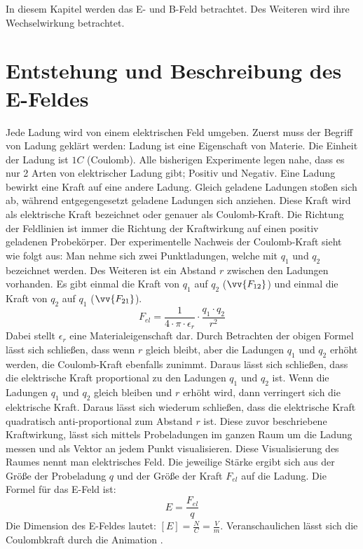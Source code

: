 In diesem Kapitel werden das E- und B-Feld betrachtet.
Des Weiteren wird ihre Wechselwirkung betrachtet.
\section{Entstehung und Beschreibung des E-Feldes}
Jede Ladung wird von einem elektrischen Feld umgeben.
Zuerst muss der Begriff von Ladung geklärt werden:
Ladung ist eine Eigenschaft von Materie.
Die Einheit der Ladung ist $1C$ (Coulomb).
Alle bisherigen Experimente legen nahe, dass es nur 2 Arten von elektrischer Ladung gibt; Positiv und Negativ.
Eine Ladung bewirkt eine Kraft auf eine andere Ladung.
Gleich geladene Ladungen stoßen sich ab, während entgegengesetzt geladene Ladungen sich anziehen.
Diese Kraft wird als elektrische Kraft bezeichnet oder genauer als Coulomb-Kraft.
Die Richtung der Feldlinien ist immer die Richtung der Kraftwirkung auf einen positiv geladenen Probekörper.
Der experimentelle Nachweis der Coulomb-Kraft sieht wie folgt aus:
Man nehme sich zwei Punktladungen, welche mit $q_1$ und $q_2$ bezeichnet werden. 
Des Weiteren ist ein Abstand $r$ zwischen den Ladungen vorhanden.
Es gibt einmal die Kraft von $q_1$ auf $q_2$ ($\vv{F_{12}}$) und einmal die Kraft von $q_2$ auf $q_1$ ($\vv{F_{21}}$).
\begin{equation*}
   F_{el} = \frac{1}{4 \cdot \pi \cdot \epsilon_r} \cdot \frac{q_1 \cdot q_2}{r^2}    
\end{equation*}
Dabei stellt $\epsilon_r$ eine Materialeigenschaft dar.
Durch Betrachten der obigen Formel lässt sich schließen, dass wenn $r$ gleich bleibt, aber die Ladungen $q_1$ und $q_2$ erhöht werden, die Coulomb-Kraft ebenfalls zunimmt.
Daraus lässt sich schließen, dass die elektrische Kraft proportional zu den Ladungen $q_1$ und $q_2$ ist. 
Wenn die Ladungen $q_1$ und $q_2$ gleich bleiben und $r$ erhöht wird, dann verringert sich die elektrische Kraft.
Daraus lässt sich wiederum schließen, dass die elektrische Kraft quadratisch anti-proportional zum Abstand $r$ ist.
Diese zuvor beschriebene Kraftwirkung, lässt sich mittels Probeladungen im ganzen Raum um die Ladung messen und als Vektor an jedem Punkt visualisieren.
Diese Visualisierung des Raumes nennt man elektrisches Feld.
Die jeweilige Stärke ergibt sich aus der Größe der Probeladung $q$ und der Größe der Kraft $F_{el}$ auf die Ladung.
Die Formel für das E-Feld ist:
\begin{equation*}
    E = \frac{F_{el}}{q}
\end{equation*}
Die Dimension des E-Feldes lautet: $[E] = \frac{N}{C} = \frac{V}{m}$.
Veranschaulichen lässt sich die Coulombkraft durch die Animation \cite{Animation}.

